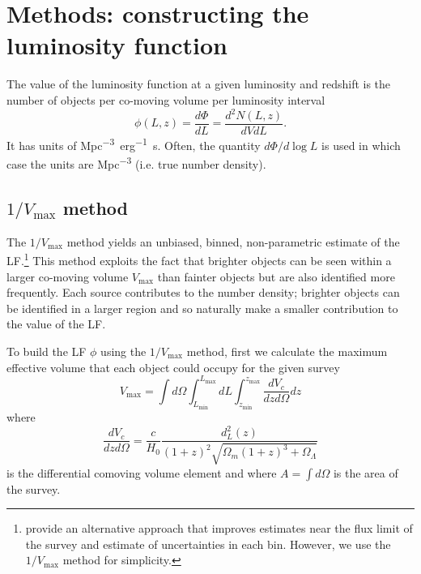 \documentclass[twocolumn, trackchanges]{aastex63}
\begin{document}

\section{Methods: constructing the luminosity function}
\label{sec:methods}
The value of the luminosity function at a given luminosity and redshift is the number of objects per co-moving volume per luminosity interval 
\begin{equation}
\label{eq:lf}
\phi(L, z) = \frac{d\Phi}{dL} = \frac{d^2N(L, z)}{dVdL}.
\end{equation}
It has units of \si{Mpc^{-3}~erg^{-1}~s}.
Often, the quantity $d\Phi/d\log L$ is used in which case the units are \si{Mpc^{-3}} (i.e. true number density).

\subsection[1/Vmax method]{\(1/V_{\mathrm{max}}\) method}
\label{sect:vmax}
The $1/V_\mathrm{max}$ method yields an unbiased, binned, non-parametric estimate of the LF.\footnote{\cite{page_improved_2000} provide an alternative approach that improves estimates near the flux limit of the survey and estimate of uncertainties in each bin. However, we use the $1/V_\mathrm{max}$ method for simplicity.}
This method exploits the fact that brighter objects can be seen within a larger co-moving volume $V_\mathrm{max}$ than fainter objects but are also identified more frequently.
Each source contributes to the number density; brighter objects can be identified in a larger region and so naturally make a smaller contribution to the value of the LF.

To build the LF $\phi$ using the $1/V_{\mathrm{max}}$ method, first we calculate the maximum effective volume that each object could occupy for the given survey
\begin{equation}
V_{\mathrm{max}}=\int d\Omega\int_{L_\mathrm{min}}^{L_\mathrm{max}}dL \int^{z_{\mathrm{max}}}_{z_{\mathrm{min}}} \frac{dV_c}{dzd\Omega}dz
\end{equation}
where
\begin{equation}
\label{eq:comov_vol}
\frac{dV_c}{dzd\Omega} = \frac{c}{H_0}\frac{d_L^2(z)}{(1+z)^2 \sqrt{\Omega_m(1+z)^3+\Omega_\Lambda}}
\end{equation}
is the differential comoving volume element and where $A=\int d\Omega$ is the area of the survey. 
\end{document}
